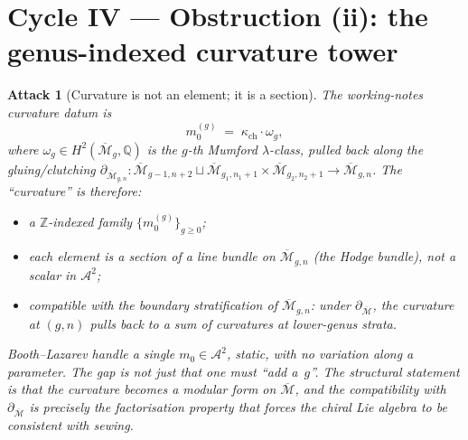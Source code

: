 \documentclass[11pt]{amsart}
\newtheorem{attack}{Attack}
\newcommand{\kch}{\kappa_{\mathrm{ch}}}
\newcommand{\cA}{\mathcal{A}}
\newcommand{\cM}{\mathcal{M}}
\newcommand{\Mbar}{\overline{\cM}}
\begin{document}
\section{Cycle IV --- Obstruction (ii): the genus-indexed curvature
tower}
\label{sec:cycle-IV}

\begin{attack}[Curvature is not an element; it is a section]
The working-notes curvature datum is
\[
m_0^{(g)} \;=\; \kch \cdot \omega_g,
\]
where $\omega_g\in H^2(\Mbar_g,\mathbb{Q})$ is the $g$-th Mumford
$\lambda$-class, pulled back along the gluing/clutching
$\partial_{\Mbar_{g,n}}:\Mbar_{g-1,n+2}\sqcup\Mbar_{g_1,n_1+1}\times
\Mbar_{g_2,n_2+1}\to\Mbar_{g,n}$. The ``curvature'' is therefore:
\begin{itemize}
\item a $\mathbb{Z}$-indexed family $\{m_0^{(g)}\}_{g\geq 0}$;
\item each element is a \emph{section} of a line bundle on
$\Mbar_{g,n}$ (the Hodge bundle), not a scalar in $\cA^2$;
\item compatible with the boundary stratification of $\Mbar_{g,n}$:
under $\partial_{\Mbar}$, the curvature at $(g,n)$ pulls back to
a sum of curvatures at lower-genus strata.
\end{itemize}
Booth--Lazarev handle a \emph{single} $m_0\in\cA^2$, static, with no
variation along a parameter. The gap is not just that one must
``add a~$g$''. The structural statement is that the curvature
becomes a \emph{modular form} on $\Mbar$, and the compatibility with
$\partial_{\Mbar}$ is precisely the factorisation property that
forces the chiral Lie algebra to be consistent with sewing.
\end{attack}
\end{document}
